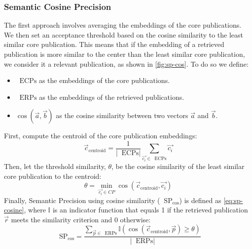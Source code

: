 \subsubsection{Semantic Cosine Precision}

The first approach involves averaging the embeddings of the core publications. We then set an acceptance threshold based on the cosine similarity to the least similar core publication. This means that if the embedding of a retrieved publication is more similar to the center than the least similar core publication, we consider it a relevant publication, as shown in \autoref{fig:sp-cos}. To do so we define:

\newcommand{\ecp}{\mathop{}\!\mathrm{ECPs}}
\newcommand{\erp}{\mathop{}\!\mathrm{ERPs}}
\newcommand{\sep}{\mathop{}\!\mathrm{SP}}

\begin{itemize}
	\item $\ecp$ as the embeddings of the core publications.
	\item $\erp$ as the embeddings of the retrieved publications.
	\item $\cos(\vec{a}, \vec{b})$ as the cosine similarity between two vectors $\vec{a}$ and $\vec{b}$.
\end{itemize}

First, compute the centroid of the core publication embeddings:
\[
\vec{c}_{\text{centroid}} = \frac{1}{|\ecp|} \sum_{\vec{c_i} \in \ecp} \vec{c_i}
\]
Then, let the threshold similarity, $\theta$, be the cosine similarity of the least similar core publication to the centroid:
\[
\theta = \min_{\vec{c_i} \in CP} \cos(\vec{c}_{\text{centroid}}, \vec{c_i})
\]
Finally, Semantic Precision using cosine similarity ($\sep_{\cos}$) is defined as \autoref{eq:sp-cosine}, where $\mathbb{I}$ is an indicator function that equals 1 if the retrieved publication $\vec{r}$ meets the similarity criterion and 0 otherwise:
\begin{equation}\label{eq:sp-cosine}
	\sep_{\cos} = \frac{\sum_{\vec{p} \in \erp} \mathbb{I} \left( \cos(\vec{c}_{\text{centroid}}, \vec{p}) \geq \theta \right)}{|\erp|}
\end{equation}

